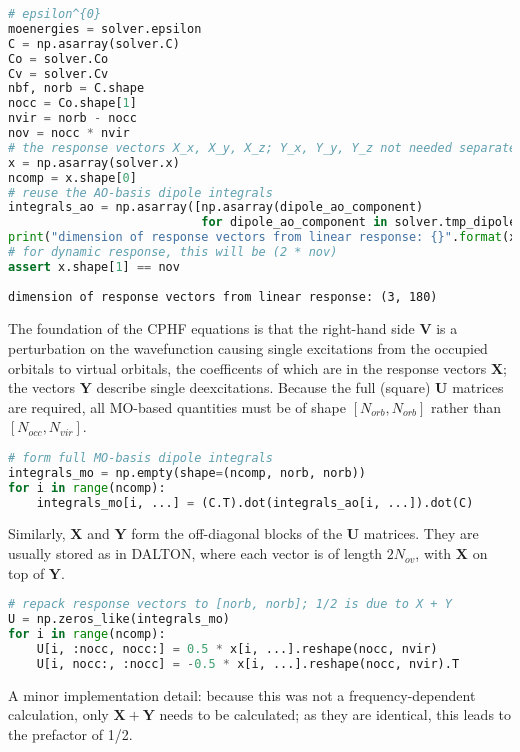 \documentclass[]{article}
\begin{document}
\begin{lstlisting}[language=Python]
# epsilon^{0}
moenergies = solver.epsilon
C = np.asarray(solver.C)
Co = solver.Co
Cv = solver.Cv
nbf, norb = C.shape
nocc = Co.shape[1]
nvir = norb - nocc
nov = nocc * nvir
# the response vectors X_x, X_y, X_z; Y_x, Y_y, Y_z not needed separately for static response
x = np.asarray(solver.x)
ncomp = x.shape[0]
# reuse the AO-basis dipole integrals
integrals_ao = np.asarray([np.asarray(dipole_ao_component)
                           for dipole_ao_component in solver.tmp_dipoles])
print("dimension of response vectors from linear response: {}".format(x.shape))
# for dynamic response, this will be (2 * nov)
assert x.shape[1] == nov
\end{lstlisting}

\begin{lstlisting}
dimension of response vectors from linear response: (3, 180)
\end{lstlisting}

The foundation of the CPHF equations is that the right-hand side
\(\mathbf{V}\) is a perturbation on the wavefunction causing single
excitations from the occupied orbitals to virtual orbitals, the
coefficents of which are in the response vectors \(\mathbf{X}\); the
vectors \(\mathbf{Y}\) describe single deexcitations. Because the full
(square) \(\mathbf{U}\) matrices are required, all MO-based quantities
must be of shape \([N_{orb}, N_{orb}]\) rather than
\([N_{occ}, N_{vir}]\).

\begin{lstlisting}[language=Python]
# form full MO-basis dipole integrals
integrals_mo = np.empty(shape=(ncomp, norb, norb))
for i in range(ncomp):
    integrals_mo[i, ...] = (C.T).dot(integrals_ao[i, ...]).dot(C)
\end{lstlisting}

Similarly, \(\mathbf{X}\) and \(\mathbf{Y}\) form the off-diagonal
blocks of the \(\mathbf{U}\) matrices. They are usually stored as in
DALTON, where each vector is of length \(2N_{ov}\), with \(\mathbf{X}\)
on top of \(\mathbf{Y}\).

\begin{lstlisting}[language=Python]
# repack response vectors to [norb, norb]; 1/2 is due to X + Y
U = np.zeros_like(integrals_mo)
for i in range(ncomp):
    U[i, :nocc, nocc:] = 0.5 * x[i, ...].reshape(nocc, nvir)
    U[i, nocc:, :nocc] = -0.5 * x[i, ...].reshape(nocc, nvir).T
\end{lstlisting}

A minor implementation detail: because this was not a
frequency-dependent calculation, only \(\mathbf{X}+\mathbf{Y}\) needs to
be calculated; as they are identical, this leads to the prefactor of
1/2.
\end{document}
